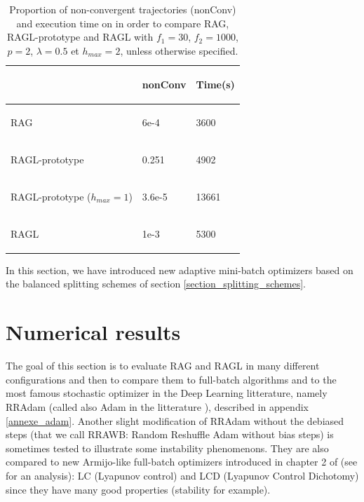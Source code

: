 \begin{table}[h!]
	\centering
	\caption{Proportion of non-convergent trajectories (nonConv) and execution time on \polyFive in order to compare RAG, RAGL-prototype and RAGL with $f_1=30$, $f_2=1000$, $p=2$, $\lambda=0.5$ et $h_{max}=2$, unless otherwise specified.}
	\begin{tabular}{lll}
		\toprule
		\begin{bf} \diagbox{Algos}{} \end{bf} & \begin{bf}nonConv\end{bf} & \begin{bf}Time(s)\end{bf} \\
		\midrule
		\begin{bf}RAG\end{bf} & 6e-4 & 3600 \\ \midrule
		\begin{bf}RAGL-prototype\end{bf} & 0.251 & 4902 \\ \midrule
		\begin{bf}RAGL-prototype ($h_{max}=1$)\end{bf} & 3.6e-5 & 13661 \\ \midrule
		\begin{bf}RAGL\end{bf} & 1e-3 & 5300 \\ \bottomrule
	\end{tabular}
	\label{polyFive_ecreme}
\end{table} 

In this section, we have introduced new adaptive mini-batch optimizers based on the balanced splitting schemes of section \ref{section_splitting_schemes}.

\section{Numerical results}
\label{section_results}

The goal of this section is to evaluate RAG and RAGL in many different configurations and then to compare them to full-batch algorithms and to the most famous stochastic optimizer
in the Deep Learning litterature, namely RRAdam (called also Adam in the litterature \cite{Adam}), described in appendix \ref{annexe_adam}. Another slight modification of RRAdam without the debiased steps (that we call RRAWB: Random Reshuffle Adam without bias steps) is sometimes tested to illustrate some instability phenomenons. They are also compared to new Armijo-like full-batch optimizers introduced in chapter 2 of \cite{Bilel_thesis} (see \cite{Lyap_Theory_Bilel} for an analysis): LC (Lyapunov control) and LCD (Lyapunov Control Dichotomy) since they have many good properties (stability for example).


